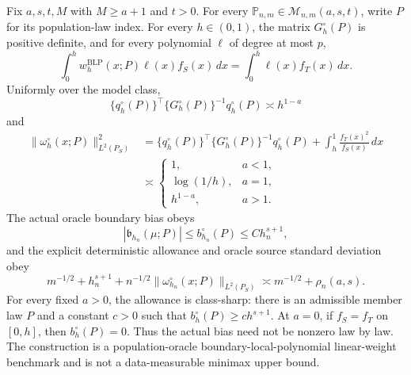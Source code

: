 Fix \(a,s,t,M\) with \(M\ge a+1\) and \(t>0\). For every \(\mathbb P_{n,m}\in\mathcal M_{n,m}(a,s,t)\), write \(P\) for its population-law index. For every \(h\in(0,1)\), the matrix \(G_h^{\circ}(P)\) is positive definite, and for every polynomial \(\ell\) of degree at most \(p\),
\[
\int_0^h w_h^{\mathrm{BLP}}(x;P)\ell(x)f_S(x)\,dx
=\int_0^h\ell(x)f_T(x)\,dx.
\]
Uniformly over the model class,
\[
\{q_h^{\circ}(P)\}^{\top}\{G_h^{\circ}(P)\}^{-1}q_h^{\circ}(P)\asymp h^{1-a}
\]
and
\[
\begin{aligned}
\|\omega_h^{\circ}(x;P)\|_{L^2(P_S)}^2
&=\{q_h^{\circ}(P)\}^{\top}\{G_h^{\circ}(P)\}^{-1}q_h^{\circ}(P)
+\int_h^1\frac{f_T(x)^2}{f_S(x)}\,dx\\
&\asymp\begin{cases}
1,&a<1,\\
\log(1/h),&a=1,\\
h^{1-a},&a>1.
\end{cases}
\end{aligned}
\]
The actual oracle boundary bias obeys
\[
|\mathfrak b_{h_n}(\mu;P)|\le b_{h_n}^{\circ}(P)\le C h_n^{s+1},
\]
and the explicit deterministic allowance and oracle source standard deviation obey
\[
m^{-1/2}+h_n^{s+1}+n^{-1/2}\|\omega_{h_n}^{\circ}(x;P)\|_{L^2(P_S)}
\asymp m^{-1/2}+\rho_n(a,s).
\]
For every fixed \(a>0\), the allowance is class-sharp: there is an admissible member law \(P\) and a constant \(c>0\) such that \(b_h^{\circ}(P)\ge c h^{s+1}\). At \(a=0\), if \(f_S=f_T\) on \([0,h]\), then \(b_h^{\circ}(P)=0\). Thus the actual bias need not be nonzero law by law. The construction is a population-oracle boundary-local-polynomial linear-weight benchmark and is not a data-measurable minimax upper bound.